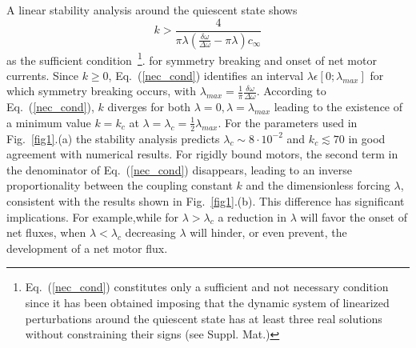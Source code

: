 \documentclass[prl,aps,twocolumn, floatfix, superscriptaddress,showpacs]{revtex4}
\begin{document}
A linear stability analysis around the quiescent  state  shows
\begin{equation}
 k>\frac{4}{\pi \lambda\left(\frac{\delta \omega}{\Delta \omega}-\pi\lambda\right)c_\infty}
\label{nec_cond}
\end{equation}
as the sufficient condition~\footnote{Eq.~(\ref{nec_cond}) constitutes only a sufficient and not necessary condition since it has been obtained  imposing that the dynamic system of linearized perturbations around the quiescent state has at least three real solutions without constraining their signs (see Suppl. Mat.)}. for symmetry breaking and onset of net motor currents.
Since $k\ge0$, Eq.~(\ref{nec_cond}) identifies an interval $\lambda \epsilon [0;\lambda_{max}]$ for which symmetry breaking occurs, with $\lambda_{max}= \frac{1}{\pi}\frac{\delta \omega}{\Delta \omega}$. According to Eq.~(\ref{nec_cond}), $k$ diverges for both $\lambda=0,\lambda=\lambda_{max}$ leading to the existence of a minimum value $k=k_c$ at $\lambda=\lambda_c=\frac{1}{2}\lambda_{max}$. For the parameters used in Fig.~\ref{fig1}.(a) the stability analysis predicts $\lambda_c\sim 8\cdot 10^{-2}$ and $k_c \lesssim 70$ in good agreement with numerical results.  For rigidly bound motors, the second term in the denominator of Eq.~(\ref{nec_cond}) disappears, leading to an inverse proportionality between the coupling constant $k$ and the dimensionless forcing $\lambda$, consistent with the results shown in Fig.~\ref{fig1}.(b). This difference has significant implications. For example,while  for $\lambda>\lambda_c$ a reduction in $\lambda$ will favor the onset of net fluxes, when    $\lambda < \lambda_c$ decreasing $\lambda$ will hinder, or even prevent, the development of a net motor flux.
\end{document}
